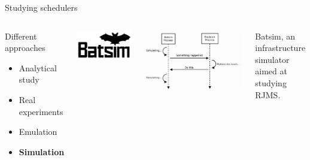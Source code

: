 \documentclass[12pt, aspectratio=43]{beamer}
\begin{document}
\begin{frame}{Studying schedulers}
	\begin{columns}
		\begin{block}{Different approaches}
			\begin{itemize}
				\item Analytical study
				\item Real experiments
				\item Emulation
				\item \textbf{Simulation}
			\end{itemize}
		\end{block}

		\centering
		\includegraphics[scale=0.3]{../imgs/batsim-logo.png}

		\vspace{4ex}

		\includegraphics[scale=0.3]{../imgs/batsim-sequence-diag.png}

		\small{Batsim, an infrastructure simulator aimed at studying RJMS.}
	\end{columns}
\end{frame}
\end{document}
